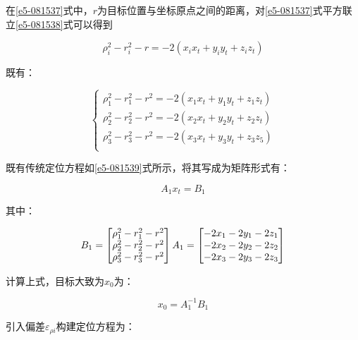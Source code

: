 在\eqref{e5-081537}式中，$r$为目标位置与坐标原点之间的距离，对\eqref{e5-081537}式平方联立\eqref{e5-081538}式可以得到\cite{weilian*feileGailulunjiqiyingyong}

\begin{equation}
\rho^2_i - r^2_i - r
= -2(x_ix_t + y_iy_t + z_iz_t)
\label{e5-081539}
\end{equation}

既有：

\begin{equation}
    \begin{cases}
        \rho_1^2 - r_1^2 - r^2 = -2(x_1x_t + y_1y_t + z_1z_t)   \\
        \rho_2^2 - r_2^2 - r^2 = -2(x_2x_t + y_2y_t + z_2z_t)   \\
        \rho_3^2 - r_3^2 - r^2 = -2(x_3x_t + y_3y_t + z_3z_5)   \\ 
    \end{cases}
\end{equation}

既有传统定位方程如\eqref{e5-081539}式所示，将其写成为矩阵形式有：

\begin{equation}
    A_1x_t = B_1
\end{equation}

其中：

\begin{equation}
    B_1=
    \left[
    \begin{matrix}
        \rho_1^2 - r_1^2 - r^2 \\
        \rho_2^2 - r_2^2 - r^2 \\
        \rho_3^2 - r_3^2 - r^2 \\
    \end{matrix}
    \right]
    A_1=
    \left[
    \begin{matrix}
        -2x_1 - 2y_1 - 2z_1 \\
        -2x_2 - 2y_2 - 2z_2 \\
        -2x_3 - 2y_3 - 2z_3 \\
    \end{matrix}
    \right]
    \notag
\end{equation}

计算上式，目标大致为$x_0$为：

\begin{equation}
    x_0 = A_1^{-1}B_1
    \label{e5-081704}
\end{equation}

引入偏差$\varepsilon_{\rho i}$构建定位方程为：

